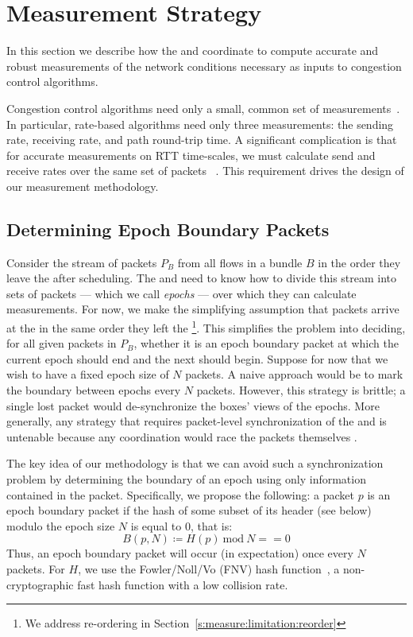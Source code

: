 \section{Measurement Strategy}\label{s:measurement}

In this section we describe how the \inbox and \outbox coordinate to compute accurate and robust
measurements of the network conditions necessary as inputs to congestion control algorithms.

Congestion control algorithms need only a small, common set of measurements~\cite{ccp-hotnets}. 
In particular, rate-based algorithms need only three measurements: 
the sending rate, receiving rate, and path round-trip time.
A significant complication is that for accurate measurements on RTT time-scales, we must calculate send and receive rates over the same set of packets~\cite{packettrain} .
This requirement drives the design of our measurement methodology.

\subsection{Determining Epoch Boundary Packets}
\label{s:measure:marking}
Consider the stream of packets $P_B$ from all flows in a bundle $B$ in the order they leave the \inbox after scheduling.
The \inbox and \outbox need to know how to divide this stream into sets 
of packets --- which we call \emph{epochs} --- over which they can calculate measurements.
For now, we make the simplifying assumption that packets arrive at the \outbox in the same order they 
left the \inbox\footnote{We address re-ordering in Section~\ref{s:measure:limitation:reorder}}.
This simplifies the problem into deciding, for all given packets in $P_B$, whether it is an epoch boundary packet at which the current epoch should end and the next should begin. 
Suppose for now that we wish to have a fixed epoch size of $N$ packets.
A naive approach would be to mark the boundary between epochs every $N$ packets. 
However, this strategy is brittle; a single lost packet would de-synchronize the boxes' views of the epochs. 
More generally, any strategy that requires packet-level synchronization of the \inbox and
\outbox is untenable because any coordination would race the packets themselves .

The key idea of our methodology is that we can avoid such a synchronization problem by determining the boundary of an epoch using only information contained in the packet.
Specifically, we propose the following: a packet $p$ is an epoch boundary packet if the hash 
of some subset of its header (see below) modulo the epoch size $N$ is equal to 0, that is:
$$B(p,N) \coloneqq H(p)\ \text{mod}\ N == 0$$
Thus, an epoch boundary packet will occur (in expectation) once every $N$ packets.
For $H$, we use the Fowler/Noll/Vo (FNV) hash function~\cite{fnv-hash}, a non-cryptographic fast hash function with a low collision rate. 

